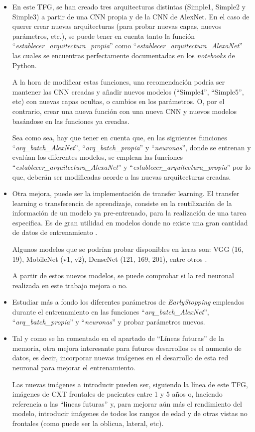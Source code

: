 \begin{itemize}
    \item En este TFG, se han creado tres arquitecturas distintas (Simple1, Simple2 y Simple3) a partir de una CNN propia y de la CNN de AlexNet. En el caso de querer crear nuevas arquitecturas (para probar nuevas capas, nuevos parámetros, etc.), se puede tener en cuenta tanto la función ``\textit{establecer\_arquitectura\_propia}'' como ``\textit{establecer\_arquitectura\_AlexaNet}'' las cuales se encuentras perfectamente documentadas en los \textit{notebooks} de Python. 

    A la hora de modificar estas funciones, una recomendación podría ser mantener las CNN creadas y añadir nuevos modelos (``Simple4'', ``Simple5'', etc) con nuevas capas ocultas, o cambios en los parámetros. O, por el contrario, crear una nueva función con una nueva CNN y nuevos modelos basándose en las funciones ya creadas. 

    Sea como sea, hay que tener en cuenta que, en las siguientes funciones ``\textit{arq\_batch\_AlexNet}'', ``\textit{arq\_batch\_propia}'' y ``\textit{neuronas}'', donde se entrenan y evalúan los diferentes modelos, se emplean las funciones ``\textit{establecer\_arquitectura\_AlexaNet}'' y  ``\textit{establecer\_arquitectura\_propia}'' por lo que, deberán ser modificadas acorde a las nuevas arquitecturas creadas.

    \item Otra mejora, puede ser la implementación de transfer learning. El transfer learning o transferencia de aprendizaje, consiste en la reutilización de la información de un modelo ya pre-entrenado, para la realización de una tarea especifica. Es de gran utilidad en modelos donde no existe una gran cantidad de datos de entrenamiento \cite{diego23}. 

    Algunos modelos que se podrían probar disponibles en keras son: VGG (16, 19), MobileNet (v1, v2), DenseNet (121, 169, 201), entre otros \cite{diego23}. 

    A partir de estos nuevos modelos, se puede comprobar si la red neuronal realizada en este trabajo mejora o no.

    \item Estudiar más a fondo los diferentes parámetros de \textit{EarlyStopping} empleados durante el entrenamiento en las funciones ``\textit{arq\_batch\_AlexNet}'', ``\textit{arq\_batch\_propia}'' y ``\textit{neuronas}'' y probar parámetros nuevos. 

    \item Tal y como se ha comentado en el apartado de ``Líneas futuras'' de la memoria, otra mejora interesante para futuros desarrollos es el aumento de datos, es decir, incorporar nuevas imágenes en el desarrollo de esta red neuronal para mejorar el entrenamiento. 

    Las nuevas imágenes a introducir pueden ser, siguiendo la línea de este TFG, imágenes de CXT frontales de pacientes entre 1 y 5 años o, haciendo referencia a las ``lineas futuras'' y, para mejorar aún más el rendimiento del modelo, introducir imágenes de todos los rangos de edad y de otras vistas no frontales (como puede ser la oblicua, lateral, etc).
\end{itemize}


